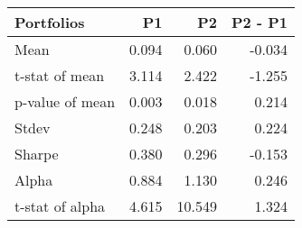\begin{tabular}{lrrr}
\toprule
Portfolios & P1 & P2 & P2 - P1 \\
\midrule
Mean & 0.094 & 0.060 & -0.034 \\
t-stat of mean & 3.114 & 2.422 & -1.255 \\
p-value of mean & 0.003 & 0.018 & 0.214 \\
Stdev & 0.248 & 0.203 & 0.224 \\
Sharpe & 0.380 & 0.296 & -0.153 \\
Alpha & 0.884 & 1.130 & 0.246 \\
t-stat of alpha & 4.615 & 10.549 & 1.324 \\
\bottomrule
\end{tabular}
